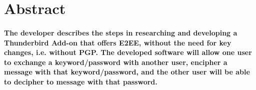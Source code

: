 \newpage
\section{Abstract}

\paragraph{The developer describes the steps in researching and developing a Thunderbird Add-on that offers E2EE, without the need for key changes, i.e. without PGP. The developed software will allow one user to exchange a keyword/password with another user, encipher a message with that keyword/password, and the other user will be able to decipher to message with that password.}